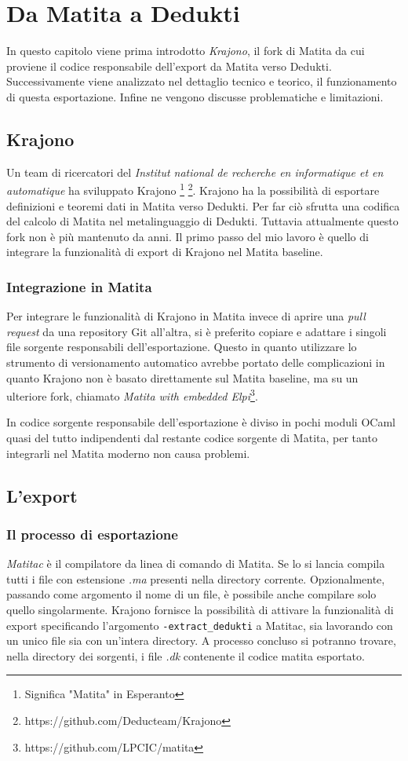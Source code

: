 \documentclass[12pt,a4paper]{report}
\begin{document}
\chapter{Da Matita a Dedukti} \label{capitoloExport}
In questo capitolo viene prima introdotto \textit{Krajono}, il fork di Matita
da cui proviene il codice responsabile dell'export da Matita verso Dedukti. 
Successivamente viene analizzato nel dettaglio tecnico e teorico, il funzionamento 
di questa esportazione. Infine ne vengono discusse problematiche e limitazioni.

\section{Krajono}
Un team di ricercatori del \textit{Institut national de recherche en informatique 
et en automatique} ha sviluppato Krajono \footnote{Significa "Matita" in Esperanto}
\footnote{https://github.com/Deducteam/Krajono}. Krajono ha la possibilità
di esportare definizioni e teoremi dati in Matita verso Dedukti. Per far ciò
sfrutta una codifica del calcolo di Matita nel metalinguaggio di Dedukti. 
Tuttavia attualmente questo fork non è più mantenuto da anni. Il primo passo
del mio lavoro è quello di integrare la funzionalità di export di Krajono
nel Matita baseline.

\subsection{Integrazione in Matita}
Per integrare le funzionalità di Krajono in Matita invece di aprire una \textit{
pull request} da una repository Git all'altra, si è preferito copiare e adattare i
singoli file sorgente responsabili dell'esportazione. Questo in quanto utilizzare
lo strumento di versionamento automatico avrebbe portato delle complicazioni in
quanto Krajono non è basato direttamente sul Matita baseline, ma su un ulteriore
fork, chiamato \textit{Matita with embedded Elpi}\footnote{https://github.com/LPCIC/matita}. 

In codice sorgente responsabile dell'esportazione è diviso in pochi moduli OCaml
quasi del tutto indipendenti dal restante codice sorgente di Matita, per tanto
integrarli nel Matita moderno non causa problemi.

\section{L'export}
\subsection{Il processo di esportazione}
\textit{Matitac} è il compilatore da linea di comando di Matita. Se lo si lancia
compila tutti i file con estensione \textit{.ma} presenti nella directory corrente. 
Opzionalmente, passando come argomento il nome di un file, è possibile anche 
compilare solo quello singolarmente. Krajono fornisce la possibilità di attivare
la funzionalità di export specificando l'argomento \texttt{-extract\_dedukti} a Matitac,
sia lavorando con un unico file sia con un'intera directory. A processo concluso 
si potranno trovare, nella directory dei sorgenti, i file \textit{.dk} contenente
il codice matita esportato.
\end{document}

